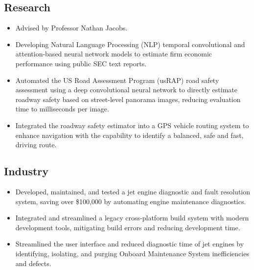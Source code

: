 \documentclass[11pt,a4paper,sans]{moderncv} %
\begin{document}
\subsection{Research}
{
\begin{itemize} 
	\item Advised by Professor Nathan Jacobs.
	\item Developing Natural Language Processing (NLP) temporal convolutional and attention-based neural network models to estimate firm economic performance using public SEC text reports. 
\end{itemize}
}
{
\begin{itemize} 
	\item Automated the US Road Assessment Program (usRAP) road safety assessment using a deep convolutional neural network to directly estimate roadway safety based on street-level panorama images, reducing evaluation time to milliseconds per image.
	\item Integrated the roadway safety estimator into a GPS vehicle routing system to enhance navigation with the capability to identify a balanced, safe and fast, driving route.
\end{itemize}
}


\subsection{Industry}

{
	\begin{itemize}
		\item Developed, maintained, and tested a jet engine diagnostic and fault resolution system, saving over \$100,000 by automating engine maintenance diagnostics.
		\item Integrated and streamlined a legacy cross-platform build system with modern development tools, mitigating build errors and reducing development time.
	\end{itemize}
}


{
\begin{itemize}
	\item Streamlined the user interface and reduced diagnostic time of jet engines by identifying, isolating, and purging Onboard Maintenance System inefficiencies and defects.
\end{itemize}
}
\end{document}
